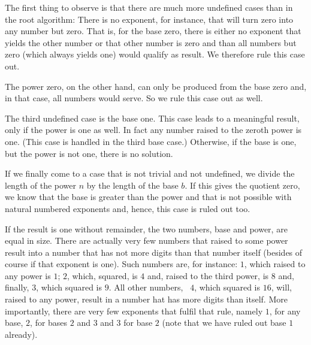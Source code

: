 \documentclass{scrreprt}
\newcommand{\Varid}[1]{\mathit{#1}}
\begin{document}
The first thing to observe is that there are much
more undefined cases than in the root algorithm:
There is no exponent, for instance, that will turn zero
into any number but zero.
That is, for the base zero, there is either no exponent
that yields the other number or that other number is zero
and than all numbers but zero (which always yields one)
would qualify as result. We therefore rule this case out.

The power zero, on the other hand,
can only be produced from the base zero and, in that case,
all numbers would serve. So we rule this case out as well.

The third undefined case is the base one.
This case leads to a meaningful result, only if
the power is one as well. In fact any number raised
to the zeroth power is one.
(This case is handled in the third base case.)
Otherwise, if the base is one, but the power is not one,
there is no solution.

If we finally come to a case that is not trivial and not undefined,
we divide the length of the power \ensuremath{\Varid{n}} by the length of the base \ensuremath{\Varid{b}}.
If this gives the quotient zero,
we know that the base is greater than the power
and that is not possible with natural numbered exponents
and, hence, this case is ruled out too.

If the result is one without remainder, 
the two numbers, base and power, are equal in size.
There are actually very few numbers that raised to some power
result into a number that has not more digits 
than that number itself (besides of course 
if that exponent is one).
Such numbers are, for instance:
\ensuremath{\mathrm{1}}, which raised to any power is \ensuremath{\mathrm{1}};
\ensuremath{\mathrm{2}}, which, squared, is \ensuremath{\mathrm{4}} and, raised to the third power,
is \ensuremath{\mathrm{8}} and, finally,
\ensuremath{\mathrm{3}}, which squared is \ensuremath{\mathrm{9}}.
All other numbers, \eg\ \ensuremath{\mathrm{4}}, which squared is \ensuremath{\mathrm{16}},
will, raised to any power, result in a number
hat has more digits than itself.
More importantly,
there are very few exponents that fulfil that rule,
namely \ensuremath{\mathrm{1}}, for any base, \ensuremath{\mathrm{2}}, for bases \ensuremath{\mathrm{2}} and \ensuremath{\mathrm{3}}
and \ensuremath{\mathrm{3}} for base \ensuremath{\mathrm{2}} (note that we have ruled out
base \ensuremath{\mathrm{1}} already).
\end{document}
